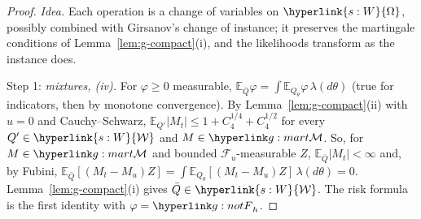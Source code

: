 \documentclass[11pt]{article}
\DeclareRobustCommand{\sy}[2]{{\hyperlink{#1}{#2}}}
\newcommand{\E}{\mathbb{E}}
\newcommand{\1}{\mathbf{1}}
\newcommand{\Wc}{\sy{s:W}{\mathcal W}}
\newcommand{\Om}{\sy{s:W}{\Omega}}
\begin{document}
\begin{proof}
\textit{Idea.} Each operation is a change of variables on $\Om$, possibly combined with Girsanov's change of instance; it preserves the martingale conditions of
Lemma~\ref{lem:g-compact}(i), and the likelihoods transform as the instance does.

Step 1: \emph{mixtures, (iv).} For $\varphi\ge0$ measurable, $\E_{\bar Q}\varphi=\int\E_{Q_\theta}\varphi\,\lambda(d\theta)$ (true for indicators, then by monotone convergence).
By Lemma~\ref{lem:g-compact}(ii) with $u=0$ and Cauchy--Schwarz, $\E_{Q'}|M_t|\le1+C_4^{1/4}+C_4^{1/2}$ for every $Q'\in\Wc$ and $M\in\gMc$. So, for $M\in\gMc$ and bounded $\mathcal F_u$-measurable $Z$,
$\E_{\bar Q}|M_t|<\infty$ and, by Fubini, $\E_{\bar Q}[(M_t-M_u)Z]=\int\E_{Q_\theta}[(M_t-M_u)Z]\,\lambda(d\theta)=0$. Lemma~\ref{lem:g-compact}(i) gives $\bar Q\in\Wc$. The risk
formula is the first identity with $\varphi=\gFh_h$.


\end{proof}
\end{document}
